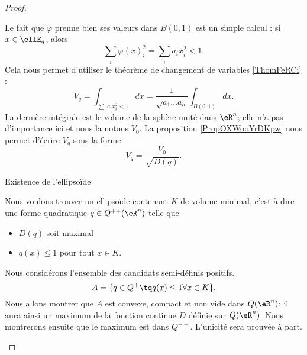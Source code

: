 \begin{proof}
\begin{subproof}
            Le fait que \( \varphi\) prenne bien ses valeurs dans \( B(0,1)\) est un simple calcul : si \( x\in\ellE_q\), alors
            \begin{equation}
                \sum_i\varphi(x)_i^2=\sum_ia_ix_i^2<1.
            \end{equation}
            Cela nous permet d'utiliser le théorème de changement de variables \ref{ThomFeRCi} :
            \begin{equation}
                V_q=\int_{\sum_ia_ix_i^2<1}dx=\frac{1}{ \sqrt{a_1\ldots a_n} }\int_{B(0,1)}dx.
            \end{equation}
            La dernière intégrale est le volume de la sphère unité dans \( \eR^n\); elle n'a pas d'importance ici et nous la notons \( V_0\). La proposition \ref{PropOXWooYrDKpw} nous permet d'écrire \(V_q\) sous la forme
            \begin{equation}
                V_q=\frac{ V_0 }{ \sqrt{D(q)} }.
            \end{equation}
            
        \item[Existence de l'ellipsoïde]

            Nous voulons trouver un ellipsoïde contenant \( K\) de volume minimal, c'est à dire une forme quadratique \( q\in Q^{++}(\eR^n)\) telle que
            \begin{itemize}
                \item \( D(q)\) soit maximal
                \item \( q(x)\leq 1\) pour tout \( x\in K\).
            \end{itemize}
            Nous considérons l'ensemble des candidats semi-définis positifs.
            \begin{equation}
                A=\{ q\in Q^+\tq q(x)\leq 1\forall x\in K \}.
            \end{equation}
            Nous allons montrer que \( A\) est convexe, compact et non vide dans \( Q(\eR^n)\); il aura ainsi un maximum de la fonction continue \( D\) définie sur \( Q(\eR^n)\). Nous montrerons ensuite que le maximum est dans \( Q^{++}\). L'unicité sera prouvée à part.


\end{subproof}
\end{proof}
